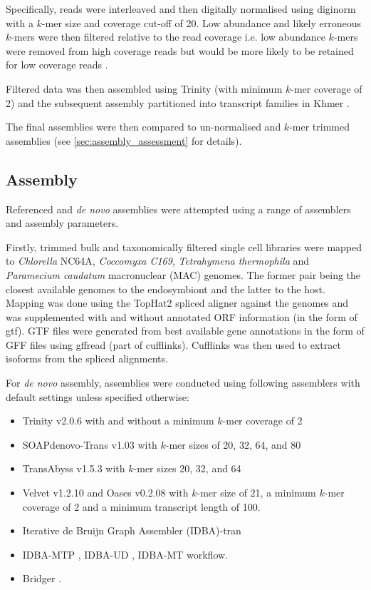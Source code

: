 Specifically, reads were interleaved \citep{Doring2008} and then digitally normalised using diginorm \citep{Brown2012}
with a \(k\)-mer size and coverage cut-off of 20.  Low abundance and likely erroneous
\(k\)-mers were then filtered relative to the read coverage i.e. low abundance \(k\)-mers were removed
from high coverage reads but would be more likely to be retained for low coverage reads \citep{Zhang2015,Zhang2014}.  

Filtered data was then assembled using Trinity (with minimum \(k\)-mer coverage of 2) 
and the subsequent assembly partitioned into transcript families in Khmer \citep{Pell2012}.

The final assemblies were then compared to un-normalised and \(k\)-mer trimmed assemblies 
(see \cref{sec:assembly_assessment} for details).


\subsection{Assembly}

Referenced and \textit{de novo} assemblies were attempted using a range of assemblers
and assembly parameters.

Firstly, trimmed bulk and taxonomically filtered single cell libraries
were mapped to \textit{Chlorella} NC64A, \textit{Coccomyxa C169}, 
\textit{Tetrahymena thermophila} and \textit{Paramecium caudatum} macronuclear (MAC) genomes.
The former pair being the closest available genomes to the endosymbiont and the latter to the host.
Mapping was done using the TopHat2 spliced aligner \citep{Kim2013} against
the genomes and was supplemented with and without annotated ORF information (in the form of gtf).
GTF files were generated from best available gene annotations in the form of GFF files using gffread (part of
cufflinks).
Cufflinks \citep{Trapnell2011} was then used to extract isoforms from the spliced alignments.

For \textit{de novo} assembly, assemblies were conducted using following 
assemblers with default settings unless specified otherwise:
\begin{itemize}
    \item Trinity v2.0.6 \citep{Grabherr2011} with and without a minimum \(k\)-mer coverage of 2
    \item SOAPdenovo-Trans v1.03 \citep{Xie2014} with \(k\)-mer sizes of 20, 32, 64, and 80   
    \item TransAbyss v1.5.3 \citep{Robertson2010} with \(k\)-mer sizes 20, 32, and 64 
    \item Velvet v1.2.10 \citep{Zerbino2008} and Oases v0.2.08 \citep{Schulz2012} with \(k\)-mer size of 
        21, a minimum \(k\)-mer coverage of 2 and a minimum transcript length
        of 100.
    \item Iterative de Bruijn Graph Assembler (IDBA)-tran \citep{Peng2010,Peng2012,Peng2013} 
    \item IDBA-MTP \citep{Leung2014}, IDBA-UD \citep{Peng2012}, IDBA-MT \citep{Leung2013} workflow.
    \item Bridger \citep{Chang2015}.
\end{itemize}

